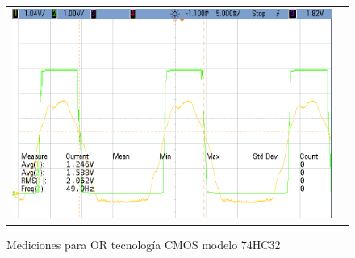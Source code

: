 \begin{figure}[H]
\begin{tabular}{c c}
        \includegraphics[scale=0.2]{../EJ5/Mediciones/Osciloscopio/CMOS_OR_SOLA/cropped_entrada_ruido.png} 
    \end{tabular}
    \caption{Mediciones para OR tecnolog\'ia CMOS modelo 74HC32}
    \label{fig:cmos_or_al_aire}
\end{figure}

